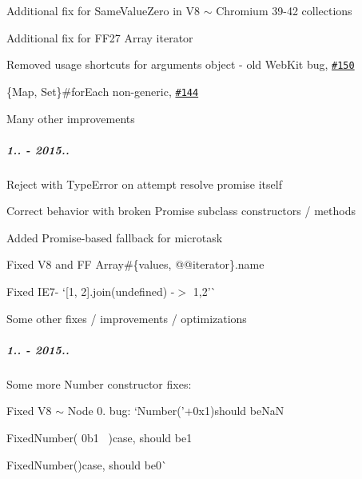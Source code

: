 \begin{DoxyItemize}
\item Additional fix for {\ttfamily Same\+Value\+Zero} in V8 $\sim$ Chromium 39-\/42 collections
\item Additional fix for F\+F27 {\ttfamily Array} iterator
\item Removed usage shortcuts for {\ttfamily arguments} object -\/ old Web\+Kit bug, \href{https://github.com/zloirock/core-js/issues/150}{\tt \#150}
\item {\ttfamily \{Map, Set\}\#for\+Each} non-\/generic, \href{https://github.com/zloirock/core-js/issues/144}{\tt \#144}
\item Many other improvements
\end{DoxyItemize}

\subparagraph*{1.. -\/ 2015..}


\begin{DoxyItemize}
\item Reject with {\ttfamily Type\+Error} on attempt resolve promise itself
\item Correct behavior with broken {\ttfamily Promise} subclass constructors / methods
\item Added {\ttfamily Promise}-\/based fallback for microtask
\item Fixed V8 and FF {\ttfamily Array\#\{values, @@iterator\}.name}
\item Fixed I\+E7-\/ `\mbox{[}1, 2\mbox{]}.join(undefined) -\/$>$ \textquotesingle{}1,2'\`{}
\item Some other fixes / improvements / optimizations
\end{DoxyItemize}

\subparagraph*{1.. -\/ 2015..}


\begin{DoxyItemize}
\item Some more {\ttfamily Number} constructor fixes\+:
\begin{DoxyItemize}
\item Fixed V8 $\sim$ Node 0. bug\+: `Number('+0x1\textquotesingle{}){\ttfamily should be}NaN{\ttfamily }
\item {\ttfamily Fixed}Number(\textquotesingle{} 0b1~\newline
\textquotesingle{}){\ttfamily case, should be}1{\ttfamily }
\item {\ttfamily Fixed}Number(){\ttfamily case, should be}0\`{}
\end{DoxyItemize}
\end{DoxyItemize}

